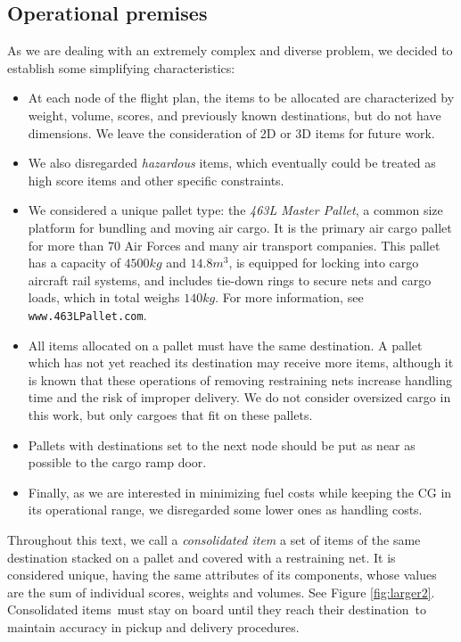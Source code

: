 \documentclass[preprint,authoryear]{elsarticle}
\begin{document}
\subsection{Operational premises}

As we are dealing with an extremely complex and diverse problem, we decided to establish some simplifying characteristics:

\begin{itemize}
	
	\item At each node of the flight plan, the items to be allocated are characterized by weight, volume, scores, and previously known destinations, but do not have dimensions. We leave the consideration of 2D or 3D items for future work.
	
	\item We also disregarded {\it hazardous} items, which eventually could be treated as high score items and other specific constraints.
	
	\item We considered a unique pallet type: the {\it 463L Master Pallet}, a common size platform for bundling and moving air cargo. It is the primary air cargo pallet for more than 70 Air Forces and many air transport companies. This pallet has a capacity of $4500 kg$ and $14.8 m^3$, is equipped for locking into cargo aircraft rail systems, and includes tie-down rings to secure nets and cargo loads, which in total weighs $140 kg$. For more information, see {\tt www.463LPallet.com}.
	
	\item All items allocated on a pallet must have the same destination. A pallet which has not yet reached its destination may receive more items, although it is known that these operations of removing restraining nets increase handling time and the risk of improper delivery. We do not consider oversized cargo in this work, but only cargoes that fit on these pallets.
	
	\item Pallets with destinations set to the next node should be put as near as possible to the cargo ramp door.

	\item Finally, as we are interested in minimizing fuel costs while keeping the CG in its operational range, we disregarded some lower ones as handling costs.

\end{itemize}

Throughout this text, we call a {\it consolidated item} a set of items of the same destination stacked on a pallet and covered with a restraining net. It is considered unique, having the same attributes of its components, whose values are the sum of individual scores, weights and volumes. See Figure \ref{fig:larger2}.
Consolidated items must stay on board until they reach their destination to maintain accuracy in pickup and delivery procedures.
\end{document}

